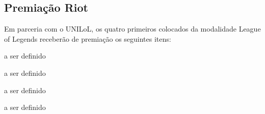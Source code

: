 \subsection{Premiação Riot}

Em parceria com o UNILoL, os quatro primeiros colocados da modalidade League of Legends receberão de premiação os seguintes itens:

\begin{description}[leftmargin=!,labelwidth=\widthof{\bfseries 1º colocado},labelindent=1.5em]
	\item[1º colocado] a ser definido
	\item[2º colocado] a ser definido
	\item[3º colocado] a ser definido
	\item[4º colocado] a ser definido
\end{description}
